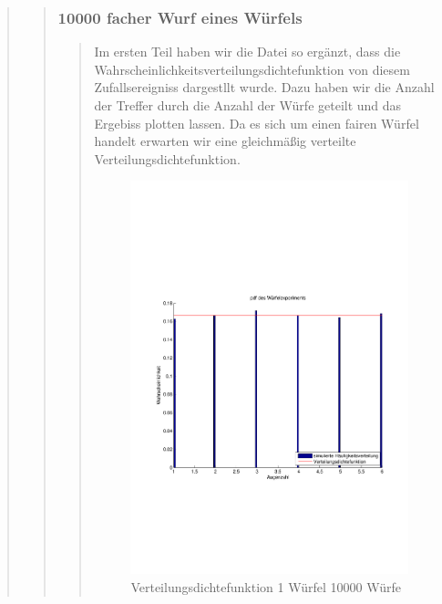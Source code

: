 \begin{quote}
\begin{quote}
        \subsubsection{10000 facher  Wurf eines Würfels}
		\begin{quote}
        Im ersten Teil haben wir die Datei so ergänzt, dass die Wahrscheinlichkeitsverteilungsdichtefunktion von diesem
        Zufallsereigniss dargestllt wurde. Dazu haben wir die Anzahl der Treffer durch die Anzahl der Würfe geteilt
        und das Ergebiss plotten lassen. Da es sich um einen fairen Würfel handelt erwarten wir eine gleichmäßig
        verteilte Verteilungsdichtefunktion.
            \begin{figure}[H]
            \centering
                \includegraphics[scale=0.7, trim = 0cm 0cm 0cm 0cm, clip]{./Bilder/1wuerfelpdf}
                    \caption{Verteilungsdichtefunktion 1 Würfel 10000 Würfe}
                    \label{fig:./Bilder/1wuerfelpdf}
            \end{figure}
    

\end{quote}
\end{quote}
\end{quote}
